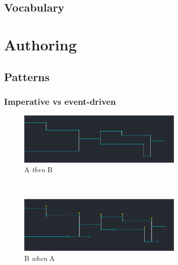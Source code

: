 \documentclass{beamer}
\begin{document}
\subsection{Vocabulary}
\begin{frame}
    \Huge
\end{frame}    
\begin{frame}[plain]
\end{frame}

\section{Authoring}
\subsection{Patterns}
\begin{frame}
    \frametitle{Imperative vs event-driven}
    \begin{figure}
        \includegraphics[width=0.7\textwidth]{images/procedural.png}
        \caption{A \emph{then} B}
    \end{figure}~\\
    \begin{figure}
        \includegraphics[width=0.7\textwidth]{images/event.png}
        \caption{B \emph{when} A}
    \end{figure}
\end{frame}
\end{document}
